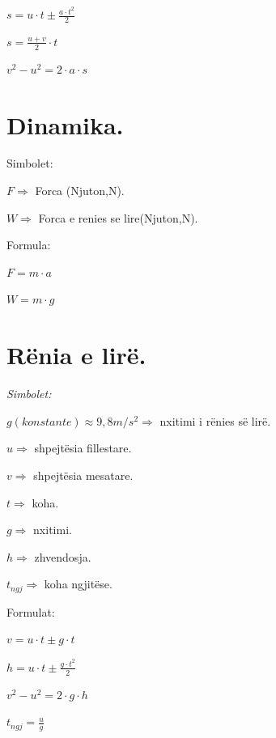 \documentclass[twocolumn]{article}
\begin{document}
	$s=u \cdot t \pm \frac{a\cdot t^2}{2}$
	
	$s=\frac{u+v}{2}\cdot t$
	
	$v^2-u^2=2\cdot a \cdot s$
	
	
	
	
	
	
	\section{Dinamika.}
	
	\begin{center}
		Simbolet:
	\end{center}
	
	$F \Rightarrow$ Forca (Njuton,N).
	
	$W \Rightarrow$ Forca e renies se lire(Njuton,N).
	
	\begin{center}
		Formula:
	\end{center}
	
	$F=m \cdot a$
	
	$W= m\cdot g$
	
	\section{Rënia e lirë.}
	
	
	\begin{center}
		\textit{Simbolet:}
	\end{center}
	
	$g (konstante) \approx 9,8 m/s^2 \Rightarrow$ nxitimi i rënies së lirë. 
	
	$u \Rightarrow$ shpejtësia fillestare. 
	
	$v \Rightarrow$ shpejtësia mesatare. 
	
	$t \Rightarrow$ koha. 
	
	$g \Rightarrow$ nxitimi. 
	
	$h \Rightarrow$ zhvendosja. 
	
	$t_{ngj} \Rightarrow$ koha ngjitëse.
	
	
	
	\begin{center}
		Formulat:
	\end{center}
	
	$v=u \cdot t \pm g \cdot t$
	
	$h=u \cdot t \pm \frac{g \cdot t^2}{2}$
	
	$v^2-u^2=2 \cdot g \cdot h$ 
	
	$t_{ngj}=\frac{u}{g}$
	
\end{document}
